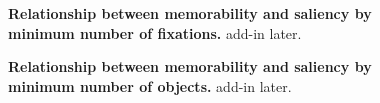 \begin{figure}[t]
\centering
{}
\vspace{-5mm}\caption{\footnotesize\textbf{Relationship between memorability and saliency by minimum number of fixations.} add-in later. }\label{fig:exampleStimuli}
\end{figure}

\begin{figure}[t]
\centering
{}
\vspace{-5mm}\caption{\footnotesize\textbf{Relationship between memorability and saliency by minimum number of objects.} add-in later. }\label{fig:exampleStimuli}
\end{figure}